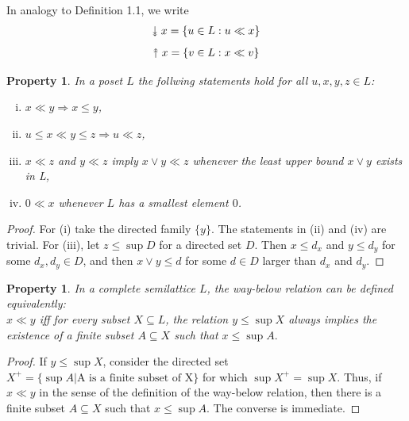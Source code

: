 \documentclass[a4paper,12pt]{article}
\newcommand{\upuparrow}{\mathrel{\reflectbox{\rotatebox[origin=c]{90}{$\twoheadrightarrow$}}}}
\newcommand{\downdownarrow}{\mathrel{\reflectbox{\rotatebox[origin=c]{90}{$\twoheadleftarrow$}}}}
\newtheorem{property}[theorem]{Property}
\begin{document}
In analogy to Definition 1.1, we write
$$\downdownarrow x =  \{u \in L: u \ll x \}$$
$$\upuparrow x =  \{v \in L: x \ll v \}$$


\begin{property}\label{wayprop}
In a poset $L$ the follwing statements hold for all $u, x, y, z \in L$:
\begin{enumerate}[(i)]
    \item $x \ll y \Rightarrow x \leq y$,
    \item $u \leq x \ll y \leq z \Rightarrow u \ll z$,
    \item $x \ll z$ and $y \ll z$ imply $x \vee y \ll z$ whenever the least upper bound $x \vee y$ exists in L,
    \item $0 \ll x$ whenever $L$ has a smallest element $0$.
\end{enumerate}
\end{property}
\begin{proof}
For (i) take the directed family $\{y\}$. The statements in (ii) and (iv) are trivial. For (iii), let $z \leq \sup D$ for a directed set $D$. Then $x \leq d_x$ and $y \leq d_y$ for some $d_x, d_y \in D$, and then $x \vee y \leq d$ for some $d \in D$ larger than $d_x$ and $d_y$.
\end{proof}

\begin{property}\label{opmerkingway}
In a complete semilattice $L$, the way-below relation can be defined equivalently: \\

\noindent $x\ll y$ iff for every subset $X \subseteq L$, the relation $y \leq \sup X$ always implies the existence of a finite subset $A \subseteq X$ such that $x \leq \sup A.$
\end{property}
\begin{proof}
If $y \leq \sup X$, consider the directed set $X^{+} = \{\sup A | \text{A is a finite subset of X} \}$ for which $\sup X^{+} = \sup X$. Thus, if $x \ll y$ in the sense of the definition of the way-below relation, then there is a finite subset $A \subseteq X$ such that $x \leq \sup A$. The converse is immediate.
\end{proof}
\end{document}
